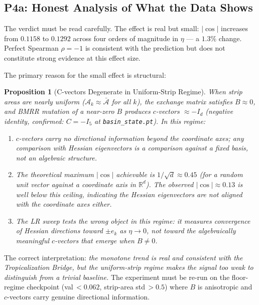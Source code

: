 \documentclass[11pt]{amsart}
\newtheorem{proposition}[theorem]{Proposition}
\begin{document}
\subsection{P4a: Honest Analysis of What the Data Shows}

The verdict must be read carefully.
The effect is real but small: $|\cos|$ increases from $0.1158$ to
$0.1292$ across four orders of magnitude in $\eta$ --- a $1.3\%$
change.
Perfect Spearman $\rho = -1$ is consistent with the prediction but
does not constitute strong evidence at this effect size.

The primary reason for the small effect is structural:

\begin{proposition}[C-vectors Degenerate in Uniform-Strip Regime]
\label{prop:cvec_degenerate}
When strip areas are nearly uniform
($\mathcal{A}_k \approx \bar{\mathcal{A}}$ for all $k$),
the exchange matrix satisfies $B \approx 0$, and BMRR mutation
of a near-zero $B$ produces $c$-vectors $\approx -I_d$
(negative identity, confirmed: $C = -I_5$ at \texttt{basin\_state.pt}).
In this regime:
\begin{enumerate}
\item $c$-vectors carry no directional information beyond the
  coordinate axes; any comparison with Hessian eigenvectors
  is a comparison against a fixed basis, not an algebraic structure.
\item The theoretical maximum $|\cos|$ achievable is
  $1/\sqrt{d} \approx 0.45$ (for a random unit vector against
  a coordinate axis in $\mathbb{R}^d$).
  The observed $|\cos| \approx 0.13$ is well below this ceiling,
  indicating the Hessian eigenvectors are not aligned with the
  coordinate axes either.
\item The LR sweep tests the wrong object in this regime:
  it measures convergence of Hessian directions toward $\pm e_k$
  as $\eta \to 0$, not toward the algebraically meaningful
  $c$-vectors that emerge when $B \neq 0$.
\end{enumerate}
\end{proposition}

The correct interpretation:
\emph{the monotone trend is real and consistent with the
Tropicalization Bridge, but the uniform-strip regime makes the
signal too weak to distinguish from a trivial baseline.}
The experiment must be re-run on the floor-regime checkpoint
(val\,$<0.062$, strip-area std\,$>0.5$) where $B$ is anisotropic
and $c$-vectors carry genuine directional information.
\end{document}

